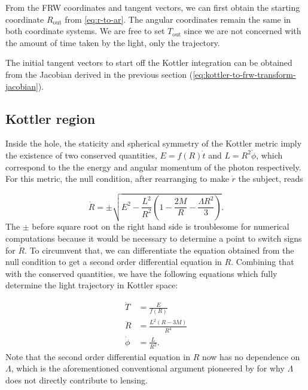 From the FRW coordinates and tangent vectors, we can first obtain the starting coordinate $R_{\text{out}}$ from \autoref{eq:r-to-ar}. The angular coordinates remain the same in both coordinate systems. We are free to set $T_{\text{out}}$ since we are not concerned with the amount of time taken by the light, only the trajectory. 

The initial tangent vectors to start off the Kottler integration can be obtained from the Jacobian derived in the previous section (\autoref{eq:kottler-to-frw-transform-jacobian}).

\subsection{Kottler region}

Inside the hole, the staticity and spherical symmetry of the Kottler metric imply the existence of two conserved quantities, $E = f(R) \dot{t}$ and $L = R^2 \dot{\phi}$, which correspond to the the energy and angular momentum of the photon respectively. For this metric, the null condition, after rearranging to make $\dot{r}$ the subject, reads

\begin{equation}
  \dot{R} = \pm \sqrt{E^2 - \frac{L^2}{R^2} \left ( 1 - \frac{2M}{R} - \frac{\Lambda R^2}{3}\right )}.
  \label{eq:kottler-null-condition}
\end{equation}
The $\pm$ before square root on the right hand side is troublesome for numerical computations because it would be necessary to determine a point to switch signs for $\dot{R}$. To circumvent that, we can differentiate the equation obtained from the null condition to get a second order differential equation in $R$. Combining that with the conserved quantities, we have the following equations which fully determine the light trajectory in Kottler space:

\begin{subequations}
  \begin{align}
    \dot{T} &= \frac{E}{f(R)}\\
    \ddot{R}  &= \frac{L^2 (R-3M)}{R^4}\\
    \dot{\phi} &= \frac{L}{R^2}.
  \end{align}
  \label{eq:kottler-null-geodesics}
\end{subequations}
Note that the second order differential equation in $R$ now has no dependence on $\Lambda$, which is the aforementioned conventional argument pioneered by \citet{islam1983cosmological} for why $\Lambda$ does not directly contribute to lensing. 

